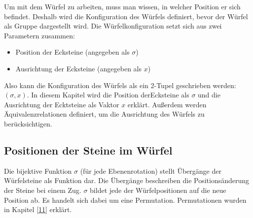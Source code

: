 \documentclass[12pt,a4paper, usenames, dvipsnames]{article}
\theoremstyle{mystyle}
\theoremstyle{definition}
\begin{document}
\label{26}
Um mit dem Würfel zu arbeiten, muss man wissen, in welcher Position er sich befindet.
Deshalb wird die Konfiguration des Würfels definiert, bevor der Würfel als Gruppe dargestellt wird. Die Würfelkonfiguration setzt sich aus zwei Parametern zusammen: 
\begin{itemize}
\item Position der Ecksteine (angegeben als $\sigma$)
\item Ausrichtung der Ecksteine (angegeben als $x$)
\end{itemize}
Also kann die Konfiguration des Würfels als ein 2-Tupel geschrieben werden: $(\sigma, x)$.
In diesem Kapitel wird die Position derEcksteine als $\sigma$ und die Ausrichtung der Ecktsteine als Vaktor $x$ erklärt. 
Außerdem werden Äquivalenzrelationen definiert, um die Ausrichtung des Würfels zu berücksichtigen.

%
%
%
%
%
%
%
%
%
%
%
%
%
%
%
%
%
%
%
%
\subsection*{Positionen der Steine im Würfel} 

Die bijektive Funktion $\sigma$ (für jede Ebenenrotation) stellt Übergänge der Würfelsteine als Funktion dar. Die Übergänge beschreiben die Positionsänderung der Steine bei einem Zug. $\sigma$ bildet jede der Würfelpositionen auf die neue Position ab. Es handelt sich dabei um eine Permutation. Permutationen wurden in Kapitel \ref{11} erklärt. 
\end{document}
